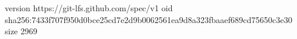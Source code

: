 version https://git-lfs.github.com/spec/v1
oid sha256:7433f707f950d0bce25cd7e2d9b0062561ea9d8a323fbaaef689cd75650c3e30
size 2969
